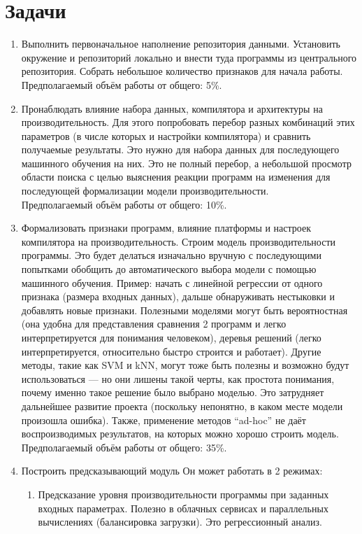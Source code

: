 \section{Задачи}
\begin{enumerate}
\item {Выполнить первоначальное наполнение репозитория данными.
Установить окружение и репозиторий локально и внести туда программы из центрального репозитория.
Собрать небольшое количество признаков для начала работы.\\
Предполагаемый объём работы от общего: 5\%.}
\item {Пронаблюдать влияние набора данных, компилятора и архитектуры на производительность. 
Для этого попробовать перебор разных комбинаций этих параметров (в числе которых и настройки компилятора) и сравнить получаемые результаты. Это нужно для набора данных для последующего машинного обучения на них. 
Это не полный перебор, а небольшой просмотр области поиска с целью выяснения реакции программ на изменения для последующей формализации модели производительности.\\
Предполагаемый объём работы от общего: 10\%.}
\item {Формализовать признаки программ, влияние платформы и настроек компилятора на производительность.
Строим модель производительности программы. Это будет делаться изначально вручную с последующими попытками обобщить до автоматического выбора модели с помощью машинного обучения. Пример: начать с линейной регрессии от одного признака (размера входных данных), дальше обнаруживать нестыковки и добавлять новые признаки.
Полезными моделями могут быть вероятностная (она удобна для представления сравнения 2 программ и легко интерпретируется для понимания человеком), деревья решений (легко интерпретируется, относительно быстро строится и работает).
Другие методы, такие как SVM и kNN, могут тоже быть полезны и возможно будут использоваться — но они лишены такой черты, как простота понимания, почему именно такое решение было выбрано моделью. Это затрудняет дальнейшее развитие проекта (поскольку непонятно, в каком месте модели произошла ошибка). Также, применение методов “ad-hoc” не даёт воспроизводимых результатов, на которых можно хорошо строить модель.\\
Предполагаемый объём работы от общего: 35\%.}
\item {Построить предсказывающий модуль
Он может работать в 2 режимах:
	\begin{enumerate}
	\item Предсказание уровня производительности программы при заданных входных параметрах. Полезно в облачных сервисах и параллельных вычислениях (балансировка загрузки). Это регрессионный анализ.

\end{enumerate}}
\end{enumerate}
